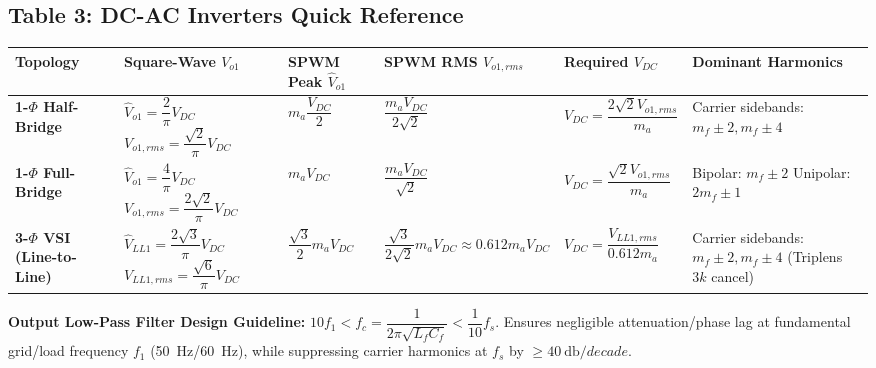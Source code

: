 \subsection{Table 3: DC-AC Inverters Quick Reference}
\vspace{-6pt}
\begin{center}
\vspace{-4pt}
\footnotesize
\renewcommand{\arraystretch}{1.12}
\begin{tabularx}{\textwidth}{@{} >{\raggedright\arraybackslash}p{2.8cm} >{\raggedright\arraybackslash}p{2.5cm} >{\raggedright\arraybackslash}p{2.5cm} >{\raggedright\arraybackslash}p{2.7cm} >{\raggedright\arraybackslash}p{2.5cm} >{\raggedright\arraybackslash}X @{}}
\toprule
\textbf{Topology} & \textbf{Square-Wave $V_{o1}$} & \textbf{SPWM Peak $\hat{V}_{o1}$} & \textbf{SPWM RMS $V_{o1,rms}$} & \textbf{Required $V_{DC}$} & \textbf{Dominant Harmonics} \\
\midrule
\textbf{1-$\Phi$ Half-Bridge} &
$\hat{V}_{o1} = \dfrac{2}{\pi}V_{DC}$ \newline
$V_{o1,rms} = \dfrac{\sqrt{2}}{\pi}V_{DC}$ &
$m_a \dfrac{V_{DC}}{2}$ &
$\dfrac{m_a V_{DC}}{2\sqrt{2}}$ &
$V_{DC} = \dfrac{2\sqrt{2}V_{o1,rms}}{m_a}$ &
Carrier sidebands: \newline
$m_f \pm 2, m_f \pm 4$ \\

\textbf{1-$\Phi$ Full-Bridge} &
$\hat{V}_{o1} = \dfrac{4}{\pi}V_{DC}$ \newline
$V_{o1,rms} = \dfrac{2\sqrt{2}}{\pi}V_{DC}$ &
$m_a V_{DC}$ &
$\dfrac{m_a V_{DC}}{\sqrt{2}}$ &
$V_{DC} = \dfrac{\sqrt{2}V_{o1,rms}}{m_a}$ &
Bipolar: $m_f \pm 2$ \newline
Unipolar: $2m_f \pm 1$ \\

\textbf{3-$\Phi$ VSI (Line-to-Line)} &
$\hat{V}_{LL1} = \dfrac{2\sqrt{3}}{\pi}V_{DC}$ \newline
$V_{LL1,rms} = \dfrac{\sqrt{6}}{\pi}V_{DC}$ &
$\dfrac{\sqrt{3}}{2} m_a V_{DC}$ &
$\dfrac{\sqrt{3}}{2\sqrt{2}} m_a V_{DC} \approx 0.612 m_a V_{DC}$ &
$V_{DC} = \dfrac{V_{LL1,rms}}{0.612 m_a}$ &
Carrier sidebands: \newline
$m_f \pm 2, m_f \pm 4$ \newline
(Triplens $3k$ cancel) \\
\bottomrule
\end{tabularx}
\vspace{-4pt}
\end{center}

\vspace{-10pt}
\noindent\textbf{Output Low-Pass Filter Design Guideline:}
$10 f_1 < f_c = \dfrac{1}{2\pi\sqrt{L_f C_f}} < \dfrac{1}{10} f_s$.
Ensures negligible attenuation/phase lag at fundamental grid/load frequency $f_1$ (\SI{50}{\hertz}/\SI{60}{\hertz}), while suppressing carrier harmonics at $f_s$ by $\ge \SI{40}{\decibel\per decade}$.

